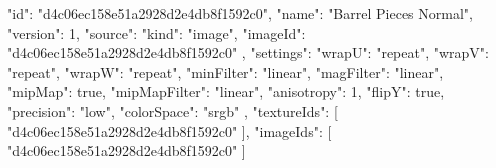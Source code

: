 {
  "id": "d4c06ec158e51a2928d2e4db8f1592c0",
  "name": "Barrel Pieces Normal",
  "version": 1,
  "source": {
    "kind": "image",
    "imageId": "d4c06ec158e51a2928d2e4db8f1592c0"
  },
  "settings": {
    "wrapU": "repeat",
    "wrapV": "repeat",
    "wrapW": "repeat",
    "minFilter": "linear",
    "magFilter": "linear",
    "mipMap": true,
    "mipMapFilter": "linear",
    "anisotropy": 1,
    "flipY": true,
    "precision": "low",
    "colorSpace": "srgb"
  },
  "textureIds": [
    "d4c06ec158e51a2928d2e4db8f1592c0"
  ],
  "imageIds": [
    "d4c06ec158e51a2928d2e4db8f1592c0"
  ]
}
